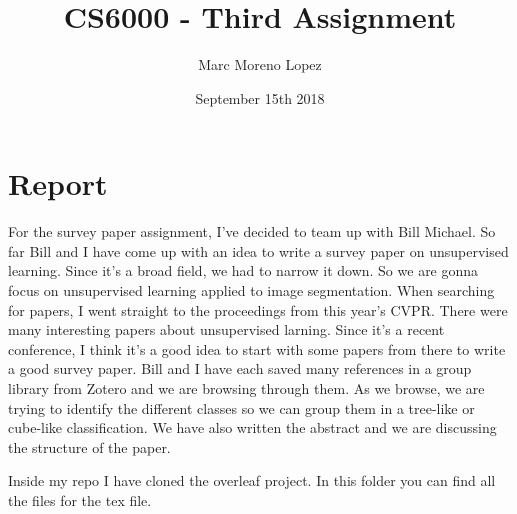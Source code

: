 \documentclass{article}
\title{CS6000 - Third Assignment}
\author{Marc Moreno Lopez}
\date{September 15th 2018}
\begin{document}
\maketitle

\section{Report}


For the survey paper assignment, I've decided to team up with Bill Michael. So far Bill and I have come up with an idea to write a survey paper on unsupervised learning. Since it's a broad field, we had to narrow it down. So we are gonna focus on unsupervised learning applied to image segmentation. When searching for papers, I went straight to the proceedings from this year's CVPR. There were many interesting papers about unsupervised larning. Since it's a recent conference, I think it's a good idea to start with some papers from there to write a good survey paper. Bill and I have each saved many references in a group library from Zotero and we are browsing through them. As we browse, we are trying to identify the different classes so we can group them in a tree-like or cube-like classification. We have also written the abstract and we are discussing the structure of the paper. 

Inside my repo I have cloned the overleaf project. In this folder you can find all the files for the tex file.
\end{document}
